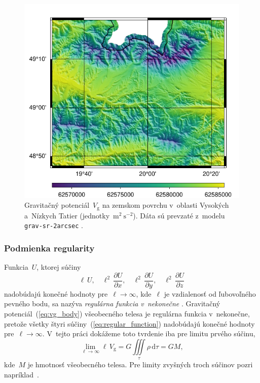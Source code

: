\documentclass[a4paper,12pt]{book}
\newcommand{\diff}{\mathrm d}
\newcommand{\gidx}{\mathrm g}
\begin{document}
\begin{figure}
\centering
\includegraphics{./fig-vg-grav-sr-2arcsec.pdf}
\caption{Gravitačný potenciál~$V_\gidx$ na zemskom povrchu v~oblasti Vysokých
a~Nízkych Tatier (jednotky~$\mathrm{m}^2 \ \mathrm{s}^{-2}$).  Dáta sú prevzaté
z~modelu \texttt{grav-sr-2arcsec} \parencite{GravSR2arcsec}.}
\label{fig:vg_grav_sr_2arcsec}
\end{figure}

\subsubsection{Podmienka regularity}

Funkcia~$U$, ktorej súčiny
%
\begin{equation}
\label{eq:regular_function}
\ell \, U{,} \quad \ell^2 \, \frac{\partial U}{\partial x}{,} \quad \ell^2 \, 
\frac{\partial U}{\partial y}{,} \quad \ell^2 \, \frac{\partial U}{\partial z}
\end{equation}
%
nadobúdajú konečné hodnoty pre~$\ell \rightarrow \infty$, kde~$\ell$ je 
vzdialenosť od ľubovoľného pevného bodu, sa nazýva \emph{regulárna funkcia 
v~nekonečne} \parencite{Kellogg1967,Pick1973}.  Gravitačný 
potenciál~(\ref{eq:vg_body}) všeobecného telesa je regulárna funkcia 
v~nekonečne, pretože všetky štyri súčiny~(\ref{eq:regular_function}) nadobúdajú 
konečné hodnoty pre~$\ell \rightarrow \infty$.  V~tejto práci dokážeme toto 
tvrdenie iba pre limitu prvého súčinu,
%
\begin{equation}
\label{eq:vg_regular}
\lim_{\ell \rightarrow \infty} \ell \, V_\gidx = G \iiint\limits_{\tau} \rho \, 
\diff\tau = GM{,}
\end{equation}
%
kde~$M$ je hmotnosť všeobecného telesa.  Pre limity zvyšných troch súčinov 
pozri napríklad~\textcite{Pick1973}.
\end{document}
